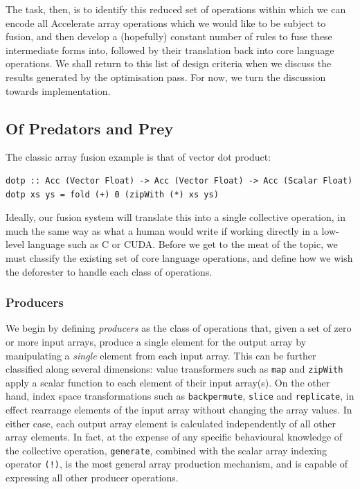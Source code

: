 The task, then, is to identify this reduced set of operations within which we
can encode all Accelerate array operations which we would like to be subject to
fusion, and then develop a (hopefully) constant number of rules to fuse these
intermediate forms into, followed by their translation back into core language
operations. We shall return to this list of design criteria when we discuss the
results generated by the optimisation pass. For now, we turn the discussion
towards implementation.

\subsection{Of Predators and Prey}

The classic array fusion example is that of vector dot product:
%
\begin{lstlisting}[style=haskell]
dotp :: Acc (Vector Float) -> Acc (Vector Float) -> Acc (Scalar Float)
dotp xs ys = fold (+) 0 (zipWith (*) xs ys)
\end{lstlisting}
%
Ideally, our fusion system will translate this into a single collective
operation, in much the same way as what a human would write if working directly
in a low-level language such as C or CUDA. Before we get to the meat of the
topic, we must classify the existing set of core language operations, and define
how we wish the deforester to handle each class of operations.

\subsubsection{Producers}

We begin by defining \emph{producers} as the class of operations
that, given a set of zero or more input arrays, produce a single element for the
output array by manipulating a \emph{single} element from each input array. This
can be further classified along several dimensions: value transformers such as
\texttt{map} and \texttt{zipWith} apply a scalar function to each element of
their input array(s). On the other hand, index space transformations such as
\texttt{backpermute}, \texttt{slice} and \texttt{replicate}, in effect rearrange
elements of the input array without changing the array values. In either case,
each output array element is calculated independently of all other array
elements. In fact, at the expense of any specific behavioural knowledge of the
collective operation, \texttt{generate}, combined with the scalar array
indexing operator \texttt{(!)}, is the most general array production mechanism,
and is capable of expressing all other producer operations.

